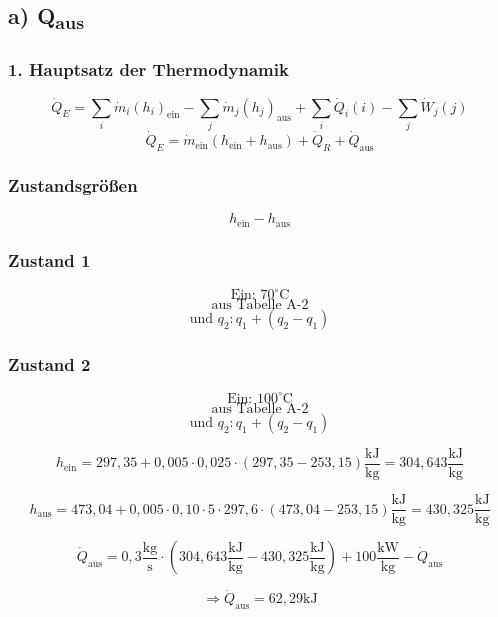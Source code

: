 \subsection*{a) Q\textsubscript{aus}}

\subsubsection*{1. Hauptsatz der Thermodynamik}
\[
\dot{Q}_E = \sum_i \dot{m}_i (h_i)_{\text{ein}} - \sum_j \dot{m}_j (h_j)_{\text{aus}} + \sum_i \dot{Q}_i (i) - \sum_j \dot{W}_j (j)
\]
\[
\dot{Q}_E = \dot{m}_{\text{ein}} (h_{\text{ein}} + h_{\text{aus}}) + \dot{Q}_R + \dot{Q}_{\text{aus}}
\]

\subsubsection*{Zustandsgrößen}
\[
h_{\text{ein}} - h_{\text{aus}}
\]

\subsubsection*{Zustand 1}
\[
\text{Ein: } 70^\circ \text{C}
\]
\[
\text{aus Tabelle A-2}
\]
\[
\text{und } q_2: q_1 + (q_2 - q_1)
\]

\subsubsection*{Zustand 2}
\[
\text{Ein: } 100^\circ \text{C}
\]
\[
\text{aus Tabelle A-2}
\]
\[
\text{und } q_2: q_1 + (q_2 - q_1)
\]

\[
h_{\text{ein}} = 297,35 + 0,005 \cdot 0,025 \cdot (297,35 - 253,15) \frac{\text{kJ}}{\text{kg}} = 304,643 \frac{\text{kJ}}{\text{kg}}
\]

\[
h_{\text{aus}} = 473,04 + 0,005 \cdot 0,10 \cdot 5 \cdot 297,6 \cdot (473,04 - 253,15) \frac{\text{kJ}}{\text{kg}} = 430,325 \frac{\text{kJ}}{\text{kg}}
\]

\[
\dot{Q}_{\text{aus}} = 0,3 \frac{\text{kg}}{\text{s}} \cdot (304,643 \frac{\text{kJ}}{\text{kg}} - 430,325 \frac{\text{kJ}}{\text{kg}}) + 100 \frac{\text{kW}}{\text{kg}} - \dot{Q}_{\text{aus}}
\]

\[
\Rightarrow \dot{Q}_{\text{aus}} = 62,29 \text{kJ}
\]